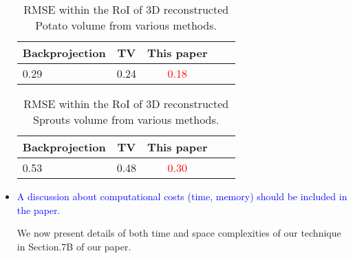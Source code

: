 \documentclass{article}
\begin{document}
\begin{itemize}
\begin{table}[!h]
  \centering
 \caption{RMSE within the RoI of 3D reconstructed Potato volume from various
    methods.}
\begin{tabular}{|l|c|c|c|c|}
\hline 
\textbf{Backprojection} & \textbf{TV} & \textbf{This paper}
\\ \hline  0.29 & 0.24 & \textcolor{red}{0.18}
\\ \hline
\end{tabular}
\label{table:potato_rmse}
\end{table}

\begin{table}[!h]
  \centering
 \caption{RMSE within the RoI of 3D reconstructed Sprouts volume from various
    methods.}
\begin{tabular}{|l|c|c|c|c|}
\hline 
\textbf{Backprojection} & \textbf{TV} & \textbf{This paper}
\\ \hline  0.53 & 0.48 & \textcolor{red}{0.30}
\\ \hline
\end{tabular}
\label{table:sprouts_rmse}
\end{table}


\item \textcolor{blue}{A discussion about computational costs (time,
  memory) should be included in the paper.}
  
  We now present details of both time and space complexities of our technique in Section.7B of our paper.


\end{itemize}
\end{document}
